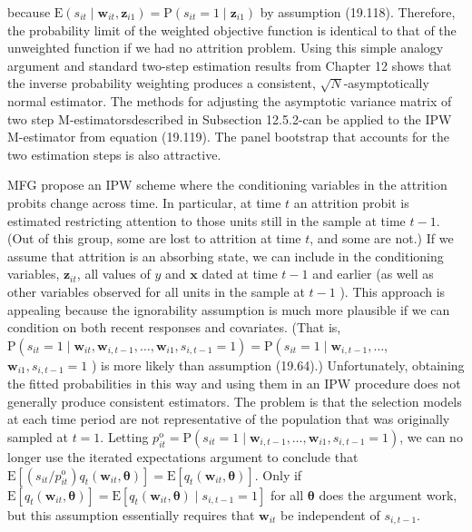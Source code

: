 \documentclass[10pt]{article}
\begin{document}
because $\mathrm{E}\left(s_{i t} \mid \mathbf{w}_{i t}, \mathbf{z}_{i 1}\right)=\mathrm{P}\left(s_{i t}=1 \mid \mathbf{z}_{i 1}\right)$ by assumption (19.118). Therefore, the probability limit of the weighted objective function is identical to that of the unweighted function if we had no attrition problem. Using this simple analogy argument and standard two-step estimation results from Chapter 12 shows that the inverse probability weighting produces a consistent, $\sqrt{N}$-asymptotically normal estimator. The methods for adjusting the asymptotic variance matrix of two step M-estimatorsdescribed in Subsection 12.5.2-can be applied to the IPW M-estimator from equation (19.119). The panel bootstrap that accounts for the two estimation steps is also attractive.

MFG propose an IPW scheme where the conditioning variables in the attrition probits change across time. In particular, at time $t$ an attrition probit is estimated restricting attention to those units still in the sample at time $t-1$. (Out of this group, some are lost to attrition at time $t$, and some are not.) If we assume that attrition is an absorbing state, we can include in the conditioning variables, $\mathbf{z}_{i t}$, all values of $y$ and $\mathbf{x}$ dated at time $t-1$ and earlier (as well as other variables observed for all units in the sample at $t-1$ ). This approach is appealing because the ignorability assumption is much more plausible if we can condition on both recent responses and covariates. (That is, $\mathrm{P}\left(s_{i t}=1 \mid \mathbf{w}_{i t}, \mathbf{w}_{i, t-1}, \ldots, \mathbf{w}_{i 1}, s_{i, t-1}=1\right)=\mathrm{P}\left(s_{i t}=1 \mid \mathbf{w}_{i, t-1}, \ldots\right.$, $\mathbf{w}_{i 1}, s_{i, t-1}=1$ ) is more likely than assumption (19.64).) Unfortunately, obtaining the fitted probabilities in this way and using them in an IPW procedure does not generally produce consistent estimators. The problem is that the selection models at each time period are not representative of the population that was originally sampled at $t=1$. Letting $p_{i t}^{\mathrm{o}}=\mathrm{P}\left(s_{i t}=1 \mid \mathbf{w}_{i, t-1}, \ldots, \mathbf{w}_{i 1}, s_{i, t-1}=1\right)$, we can no longer use the iterated expectations argument to conclude that $\mathrm{E}\left[\left(s_{i t} / p_{i t}^{\mathrm{o}}\right) q_{t}\left(\mathbf{w}_{i t}, \boldsymbol{\theta}\right)\right]=\mathrm{E}\left[q_{t}\left(\mathbf{w}_{i t}, \boldsymbol{\theta}\right)\right]$. Only if $\mathrm{E}\left[q_{t}\left(\mathbf{w}_{i t}, \boldsymbol{\theta}\right)\right]=\mathrm{E}\left[q_{t}\left(\mathbf{w}_{i t}, \boldsymbol{\theta}\right) \mid s_{i, t-1}=1\right]$ for all $\boldsymbol{\theta}$ does the argument work, but this assumption essentially requires that $\mathbf{w}_{i t}$ be independent of $s_{i, t-1}$.
\end{document}
